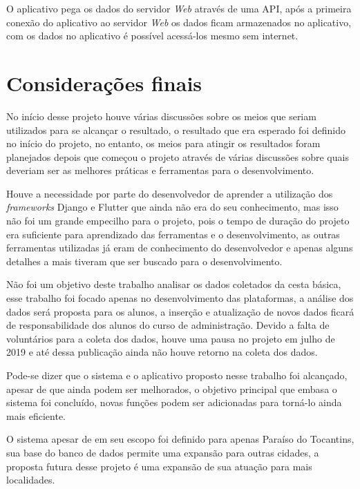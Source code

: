 \documentclass{ifto-tex}
\begin{document}
O aplicativo pega os dados do servidor \textit{Web} através de uma API, após a primeira conexão do aplicativo ao servidor \textit{Web} os dados ficam armazenados no aplicativo, com os dados no aplicativo é possível acessá-los mesmo sem internet.

\chapter{Considerações finais}
No início desse projeto houve várias discussões sobre os meios que seriam utilizados para se alcançar o
resultado, o resultado que era esperado foi definido no início do projeto, no entanto, os meios para atingir os
resultados foram planejados depois que começou o projeto através de várias discussões sobre quais deveriam ser as
melhores práticas e ferramentas para o desenvolvimento.

Houve a necessidade por parte do desenvolvedor de aprender a utilização dos \textit{frameworks} Django e Flutter que ainda
não era do seu conhecimento, mas isso não foi um grande empecilho para o projeto, pois o tempo de duração do
projeto era suficiente para aprendizado das ferramentas e o desenvolvimento, as outras ferramentas utilizadas já eram
de conhecimento do desenvolvedor e apenas alguns detalhes a mais tiveram que ser buscado para o
desenvolvimento.

Não foi um objetivo deste trabalho analisar os dados coletados da cesta básica, esse trabalho foi focado
apenas no desenvolvimento das plataformas, a análise dos dados será proposta para os alunos, a inserção e atualização de novos dados ficará de responsabilidade dos alunos do
curso de administração. Devido a falta de voluntários para a coleta dos dados, houve uma pausa no projeto em julho de 2019 e até dessa publicação ainda não houve retorno na coleta dos dados.

Pode-se dizer que o sistema e o aplicativo proposto nesse trabalho foi alcançado, apesar de que ainda podem ser
melhorados, o objetivo principal que embasa o sistema foi concluído, novas funções podem ser adicionadas para
torná-lo ainda mais eficiente.

O sistema apesar de em seu escopo foi definido para apenas Paraíso do Tocantins, sua base do banco de
dados permite uma expansão para outras cidades, a proposta futura desse projeto é uma expansão de sua atuação
para mais localidades.


\end{document}
